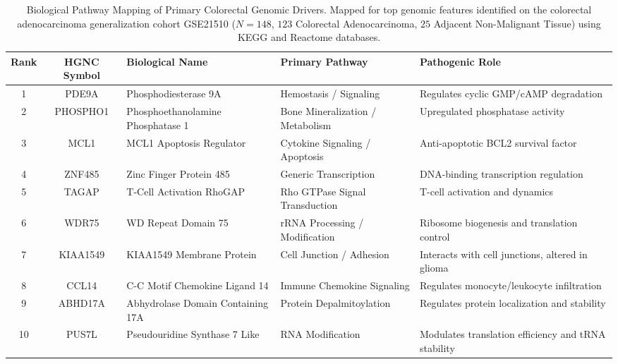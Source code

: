 \documentclass[journal,10pt]{IEEEtran}
\begin{document}
\begin{table}[htbp]
\centering
\caption{Biological Pathway Mapping of Primary Colorectal Genomic Drivers. Mapped for top genomic features identified on the colorectal adenocarcinoma generalization cohort GSE21510 ($N=148$, $123$ Colorectal Adenocarcinoma, $25$ Adjacent Non-Malignant Tissue) using KEGG and Reactome databases.}
\label{tab:colorectal_features}
\begin{tabular}{cclll}
\toprule
\textbf{Rank} & \textbf{HGNC Symbol} & \textbf{Biological Name} & \textbf{Primary Pathway} & \textbf{Pathogenic Role} \\
\midrule
1 & PDE9A & Phosphodiesterase 9A & Hemostasis / Signaling & Regulates cyclic GMP/cAMP degradation \\
2 & PHOSPHO1 & Phosphoethanolamine Phosphatase 1 & Bone Mineralization / Metabolism & Upregulated phosphatase activity \\
3 & MCL1 & MCL1 Apoptosis Regulator & Cytokine Signaling / Apoptosis & Anti-apoptotic BCL2 survival factor \\
4 & ZNF485 & Zinc Finger Protein 485 & Generic Transcription & DNA-binding transcription regulation \\
5 & TAGAP & T-Cell Activation RhoGAP & Rho GTPase Signal Transduction & T-cell activation and dynamics \\
6 & WDR75 & WD Repeat Domain 75 & rRNA Processing / Modification & Ribosome biogenesis and translation control \\
7 & KIAA1549 & KIAA1549 Membrane Protein & Cell Junction / Adhesion & Interacts with cell junctions, altered in glioma \\
8 & CCL14 & C-C Motif Chemokine Ligand 14 & Immune Chemokine Signaling & Regulates monocyte/leukocyte infiltration \\
9 & ABHD17A & Abhydrolase Domain Containing 17A & Protein Depalmitoylation & Regulates protein localization and stability \\
10 & PUS7L & Pseudouridine Synthase 7 Like & RNA Modification & Modulates translation efficiency and tRNA stability \\
\bottomrule
\end{tabular}
\end{table}
\end{document}
